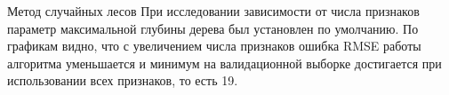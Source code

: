 \documentclass[12pt]{article}
\begin{document}
\begin{section}{Метод случайных лесов}
При исследовании зависимости от числа признаков параметр максимальной глубины дерева был установлен по умолчанию. По графикам видно, что с увеличением числа признаков ошибка RMSE работы алгоритма уменьшается и минимум на валидационной выборке достигается при использовании всех признаков, то есть 19.

\begin{figure}[h!]
\begin{minipage}[h]{0.5\linewidth}
\end{minipage}
\hfill
\begin{minipage}[h]{0.5\linewidth}

\end{minipage}
\end{figure}
\end{section}
\end{document}
